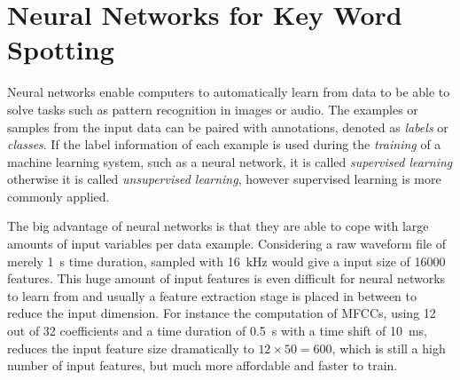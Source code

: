 
\section{Neural Networks for Key Word Spotting}\label{sec:intro_nn}
\thesisStateReady
Neural networks enable computers to automatically learn from data to be able to solve tasks such as pattern recognition in images or audio.
The examples or samples from the input data can be paired with annotations, denoted as \emph{labels} or \emph{classes}.
If the label information of each example is used during the \emph{training} of a machine learning system, such as a neural network, it is called \emph{supervised learning} otherwise it is called \emph{unsupervised learning}, however supervised learning is more commonly applied.

The big advantage of neural networks is that they are able to cope with large amounts of input variables per data example.
Considering a raw waveform file of merely \SI{1}{s} time duration, sampled with \SI{16}{\kilo\hertz} would give a input size of 16000 features.
This huge amount of input features is even difficult for neural networks to learn from and usually a feature extraction stage is placed in between to reduce the input dimension.
For instance the computation of MFCCs, using 12 out of 32 coefficients and a time duration of \SI{0.5}{s} with a time shift of \SI{10}{\milli\second}, reduces the input feature size dramatically to $12 \times 50 = 600$, which is still a high number of input features, but much more affordable and faster to train.


